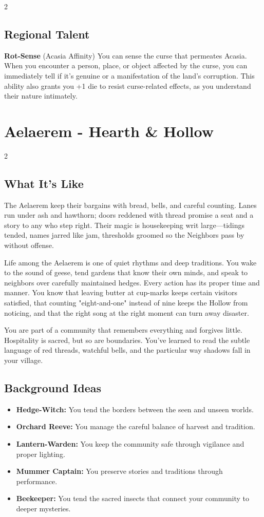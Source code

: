 \documentclass[11pt]{article}
\newcommand{\region}[1]{\section*{#1}}
\newcommand{\subregion}[1]{\subsection*{#1}}
\begin{document}
\begin{multicols}{2}
\subregion{Regional Talent}

\textbf{Rot-Sense} (Acasia Affinity)
You can sense the curse that permeates Acasia. When you encounter a person, place, or object affected by the curse, you can immediately tell if it's genuine or a manifestation of the land's corruption. This ability also grants you +1 die to resist curse-related effects, as you understand their nature intimately.

\end{multicols}

\region{Aelaerem - Hearth \& Hollow}

\begin{multicols}{2}
\subregion{What It's Like}

The Aelaerem keep their bargains with bread, bells, and careful counting. Lanes run under ash and hawthorn; doors reddened with thread promise a seat and a story to any who step right. Their magic is housekeeping writ large---tidings tended, names jarred like jam, thresholds groomed so the Neighbors pass by without offense.

Life among the Aelaerem is one of quiet rhythms and deep traditions. You wake to the sound of geese, tend gardens that know their own minds, and speak to neighbors over carefully maintained hedges. Every action has its proper time and manner. You know that leaving butter at cup-marks keeps certain visitors satisfied, that counting "eight-and-one" instead of nine keeps the Hollow from noticing, and that the right song at the right moment can turn away disaster.

You are part of a community that remembers everything and forgives little. Hospitality is sacred, but so are boundaries. You've learned to read the subtle language of red threads, watchful bells, and the particular way shadows fall in your village.

\columnbreak

\subregion{Background Ideas}

\begin{itemize}[leftmargin=*]
    \item \textbf{Hedge-Witch:} You tend the borders between the seen and unseen worlds.
    \item \textbf{Orchard Reeve:} You manage the careful balance of harvest and tradition.
    \item \textbf{Lantern-Warden:} You keep the community safe through vigilance and proper lighting.
    \item \textbf{Mummer Captain:} You preserve stories and traditions through performance.
    \item \textbf{Beekeeper:} You tend the sacred insects that connect your community to deeper mysteries.
\end{itemize}


\end{multicols}
\end{document}
